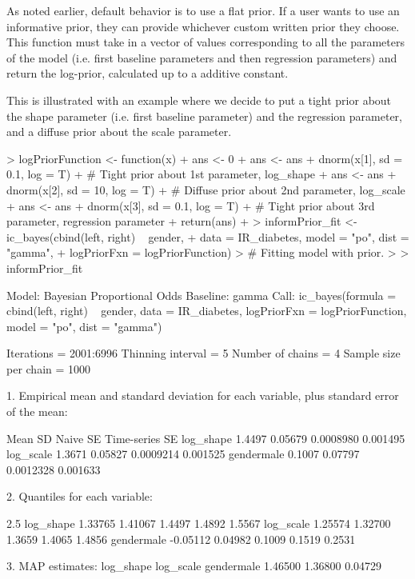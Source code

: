 \documentclass[a4paper]{article}
\begin{document}
As noted earlier, default behavior is to use a flat prior. If a user wants to use an informative prior, they can provide whichever custom written prior they choose. This function must take in a vector of values corresponding to all the parameters of the model (i.e. first baseline parameters and then regression parameters) and return the log-prior, calculated up to a additive constant. 

This is illustrated with an example where we decide to put a tight prior about the shape parameter (i.e. first baseline parameter) and the regression parameter, and a diffuse prior about the scale parameter. 

\begin{Schunk}
\begin{Sinput}
>  logPriorFunction <- function(x){
+    ans <- 0 
+    ans <- ans + dnorm(x[1], sd = 0.1, log = T)
+    # Tight prior about 1st parameter, log_shape
+    ans <- ans + dnorm(x[2], sd = 10, log = T)
+    # Diffuse prior about 2nd parameter, log_scale
+    ans <- ans + dnorm(x[3], sd = 0.1, log = T)
+    # Tight prior about 3rd parameter, regression parameter
+    return(ans)
+  }    
> informPrior_fit <- ic_bayes(cbind(left, right) ~ gender,
+     data = IR_diabetes, model = "po", dist = "gamma",
+     logPriorFxn = logPriorFunction)
> # Fitting model with prior. 
> 
> informPrior_fit
\end{Sinput}
\begin{Soutput}
Model:  Bayesian Proportional Odds
Baseline:  gamma 
Call: ic_bayes(formula = cbind(left, right) ~ gender, data = IR_diabetes, 
    logPriorFxn = logPriorFunction, model = "po", dist = "gamma")


Iterations = 2001:6996
Thinning interval = 5 
Number of chains = 4 
Sample size per chain = 1000 

1. Empirical mean and standard deviation for each variable,
   plus standard error of the mean:

             Mean      SD  Naive SE Time-series SE
log_shape  1.4497 0.05679 0.0008980       0.001495
log_scale  1.3671 0.05827 0.0009214       0.001525
gendermale 0.1007 0.07797 0.0012328       0.001633

2. Quantiles for each variable:

               2.5%
log_shape   1.33765 1.41067 1.4497 1.4892 1.5567
log_scale   1.25574 1.32700 1.3659 1.4065 1.4856
gendermale -0.05112 0.04982 0.1009 0.1519 0.2531

3. MAP estimates:
 log_shape  log_scale gendermale 
   1.46500    1.36800    0.04729 
\end{Soutput}
\end{Schunk}
\end{document}
